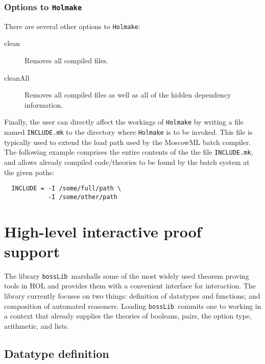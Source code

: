 \documentclass[12pt,fleqn,layout,a4paper]{report}
\begin{document}
\subsection{Options to {\tt Holmake}}

There are several other options to {\tt Holmake}:
\begin{description}

\item[clean] Removes all compiled files.

\item [cleanAll] Removes all compiled files as well as all of the hidden
dependency information.
\end{description}

Finally, the user can directly affect the workings of \verb+Holmake+ by
writing a file named \verb+INCLUDE.mk+ to the directory where
\verb+Holmake+ is to be invoked. This file is typically used to extend
the load path used by the MoscowML batch compiler. The following example
comprises the entire contents of the the file \verb+INCLUDE.mk+, and
allows already compiled code/theories to be found by the batch system
at the given paths:
\begin{verbatim}
  INCLUDE = -I /some/full/path \
            -I /some/other/path
\end{verbatim}

\chapter{High-level interactive proof support}\label{bossLib}

\newcommand\bossLib{{\tt bossLib}}
The library \bossLib\ marshalls some of the most widely used
theorem proving tools in HOL and provides them with a convenient
interface for interaction. The library currently focuses on two things:
definition of datatypes and functions; and composition of automated
reasoners. Loading \bossLib\ commits one to working in a context
that already supplies the theories of booleans, pairs, the option type,
arithmetic, and lists.

\section{Datatype definition}
\end{document}
